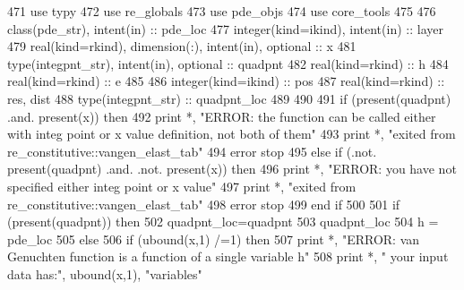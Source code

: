 \begin{DoxyCode}
471       \textcolor{keywordtype}{use }typy
472       \textcolor{keywordtype}{use }re_globals
473       \textcolor{keywordtype}{use }pde_objs
474       \textcolor{keywordtype}{use }core_tools
475 
476       \textcolor{keywordtype}{class}(pde_str), \textcolor{keywordtype}{intent(in)} :: pde\_loc 
477       \textcolor{keywordtype}{integer(kind=ikind)}, \textcolor{keywordtype}{intent(in)} :: layer
479       \textcolor{keywordtype}{real(kind=rkind)}, \textcolor{keywordtype}{dimension(:)}, \textcolor{keywordtype}{intent(in)}, \textcolor{keywordtype}{optional} :: x
481       \textcolor{keywordtype}{type}(integpnt_str), \textcolor{keywordtype}{intent(in)}, \textcolor{keywordtype}{optional} :: quadpnt
482       \textcolor{keywordtype}{real(kind=rkind)} :: h
484       \textcolor{keywordtype}{real(kind=rkind)} :: e
485 
486       \textcolor{keywordtype}{integer(kind=ikind)} :: pos
487       \textcolor{keywordtype}{real(kind=rkind)} :: res, dist
488       \textcolor{keywordtype}{type}(integpnt_str) :: quadpnt\_loc     
489          
490       
491       \textcolor{keywordflow}{if} (\textcolor{keyword}{present}(quadpnt) .and. \textcolor{keyword}{present}(x)) \textcolor{keywordflow}{then}
492         print *, \textcolor{stringliteral}{"ERROR: the function can be called either with integ point or x value definition, not both
       of them"}
493         print *, \textcolor{stringliteral}{"exited from re\_constitutive::vangen\_elast\_tab"}
494         error stop
495       \textcolor{keywordflow}{else} \textcolor{keywordflow}{if} (.not. \textcolor{keyword}{present}(quadpnt) .and. .not. \textcolor{keyword}{present}(x)) \textcolor{keywordflow}{then}
496         print *, \textcolor{stringliteral}{"ERROR: you have not specified either integ point or x value"}
497         print *, \textcolor{stringliteral}{"exited from re\_constitutive::vangen\_elast\_tab"}
498         error stop
499 \textcolor{keywordflow}{      end if}
500       
501       \textcolor{keywordflow}{if} (\textcolor{keyword}{present}(quadpnt)) \textcolor{keywordflow}{then}
502         quadpnt\_loc=quadpnt
503         quadpnt\_loc%
504         h = pde\_loc%
505       \textcolor{keywordflow}{else}
506         \textcolor{keywordflow}{if} (ubound(x,1) /=1) \textcolor{keywordflow}{then}
507           print *, \textcolor{stringliteral}{"ERROR: van Genuchten function is a function of a single variable h"}
508           print *, \textcolor{stringliteral}{"       your input data has:"}, ubound(x,1), \textcolor{stringliteral}{"variables"}

\end{DoxyCode}

